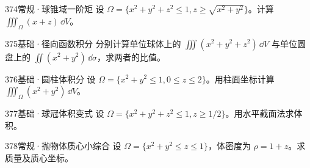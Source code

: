 \begin{exercise}{374}{常规·球锥域一阶矩}
设 $\Omega=\{x^2+y^2+z^2\leq1,z\geq\sqrt{x^2+y^2}\}$。计算 $\iiint_\Omega(x+z)\,\dd V$。
\end{exercise}
\begin{exercise}{375}{基础·径向函数积分}
分别计算单位球体上的 $\iiint(x^2+y^2+z^2)\,\dd V$ 与单位圆盘上的 $\iint(x^2+y^2)\,\dd\sigma$，求两者的比值。
\end{exercise}
\begin{exercise}{376}{基础·圆柱体积分}
设 $\Omega=\{x^2+y^2\leq1,0\leq z\leq2\}$。用柱面坐标计算 $\iiint_\Omega(x^2+y^2)\,\dd V$。
\end{exercise}
\begin{exercise}{377}{基础·球冠体积变式}
设 $\Omega=\{x^2+y^2+z^2\leq1,z\geq1/2\}$。用水平截面法求体积。
\end{exercise}
\begin{exercise}{378}{常规·抛物体质心小综合}
设 $\Omega=\{x^2+y^2\leq z\leq1\}$，体密度为 $\rho=1+z$。求质量及质心坐标。
\end{exercise}
